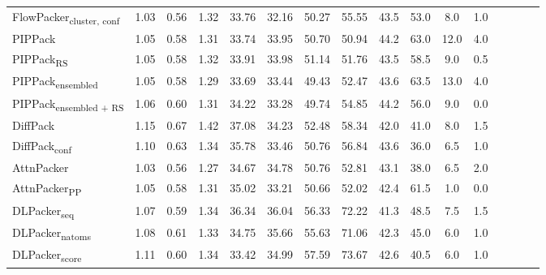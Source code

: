 \begin{table}
{\begin{tabular}{@{}lccccccccccccccc@{}}
                \textnormal{\hspace{0.5cm}FlowPacker\textsubscript{cluster, conf}} & 1.03 & 0.56 & 1.32 & 33.76 & 32.16 & 50.27 & 55.55 & 43.5 & 53.0 & 8.0 & 1.0 \\
                \textnormal{\hspace{0.5cm}PIPPack} & 1.05 & 0.58 & 1.31 & 33.74 & 33.95 & 50.70 & 50.94 & 44.2 & 63.0 & 12.0 & 4.0 \\
                \textnormal{\hspace{0.5cm}PIPPack\textsubscript{RS}} & 1.05 & 0.58 & 1.32 & 33.91 & 33.98 & 51.14 & 51.76 & 43.5 & 58.5 & 9.0 & 0.5 \\
                \textnormal{\hspace{0.5cm}PIPPack\textsubscript{ensembled}} & 1.05 & 0.58 & 1.29 & 33.69 & 33.44 & 49.43 & 52.47 & 43.6 & 63.5 & 13.0 & 4.0 \\
                \textnormal{\hspace{0.5cm}PIPPack\textsubscript{ensembled + RS}} & 1.06 & 0.60 & 1.31 & 34.22 & 33.28 & 49.74 & 54.85 & 44.2 & 56.0 & 9.0 & 0.0 \\
                \textnormal{\hspace{0.5cm}DiffPack} & 1.15 & 0.67 & 1.42 & 37.08 & 34.23 & 52.48 & 58.34 & 42.0 & 41.0 & 8.0 & 1.5 \\
                \textnormal{\hspace{0.5cm}DiffPack\textsubscript{conf}} & 1.10 & 0.63 & 1.34 & 35.78 & 33.46 & 50.76 & 56.84 & 43.6 & 36.0 & 6.5 & 1.0 \\
                \textnormal{\hspace{0.5cm}AttnPacker} & 1.03 & 0.56 & 1.27 & 34.67 & 34.78 & 50.76 & 52.81 & 43.1 & 38.0 & 6.5 & 2.0 \\
                \textnormal{\hspace{0.5cm}AttnPacker\textsubscript{PP}} & 1.05 & 0.58 & 1.31 & 35.02 & 33.21 & 50.66 & 52.02 & 42.4 & 61.5 & 1.0 & 0.0 \\
                \textnormal{\hspace{0.5cm}DLPacker\textsubscript{seq}} & 1.07 & 0.59 & 1.34 & 36.34 & 36.04 & 56.33 & 72.22 & 41.3 & 48.5 & 7.5 & 1.5 \\
                \textnormal{\hspace{0.5cm}DLPacker\textsubscript{natoms}} & 1.08 & 0.61 & 1.33 & 34.75 & 35.66 & 55.63 & 71.06 & 42.3 & 45.0 & 6.0 & 1.0 \\
                \textnormal{\hspace{0.5cm}DLPacker\textsubscript{score}} & 1.11 & 0.60 & 1.34 & 33.42 & 34.99 & 57.59 & 73.67 & 42.6 & 40.5 & 6.0 & 1.0 \\

\end{tabular}}
\end{table}
